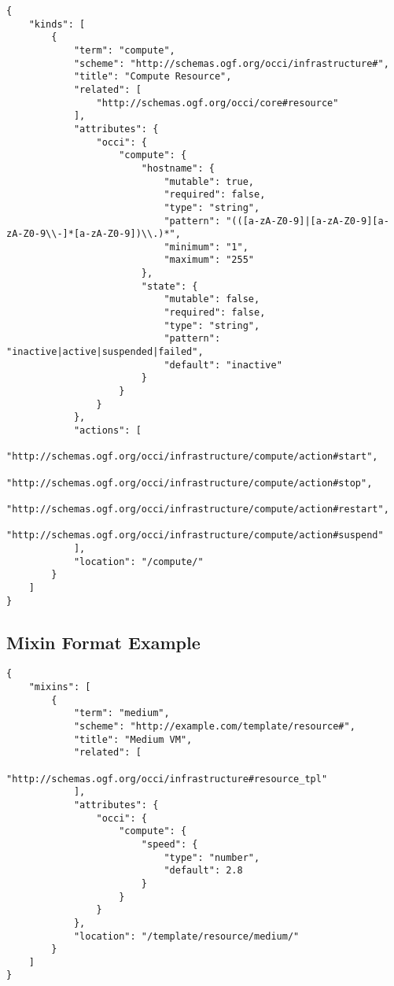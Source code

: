 \documentclass[10pt,a4paper]{article}
\begin{document}
\begin{verbatim}
{
    "kinds": [
        {
            "term": "compute",
            "scheme": "http://schemas.ogf.org/occi/infrastructure#",
            "title": "Compute Resource",
            "related": [
                "http://schemas.ogf.org/occi/core#resource"
            ],
            "attributes": {
                "occi": {
                    "compute": {
                        "hostname": {
                            "mutable": true,
                            "required": false,
                            "type": "string",
                            "pattern": "(([a-zA-Z0-9]|[a-zA-Z0-9][a-zA-Z0-9\\-]*[a-zA-Z0-9])\\.)*",
                            "minimum": "1",
                            "maximum": "255"
                        },
                        "state": {
                            "mutable": false,
                            "required": false,
                            "type": "string",
                            "pattern": "inactive|active|suspended|failed",
                            "default": "inactive"
                        }
                    }
                }
            },
            "actions": [
                "http://schemas.ogf.org/occi/infrastructure/compute/action#start",
                "http://schemas.ogf.org/occi/infrastructure/compute/action#stop",
                "http://schemas.ogf.org/occi/infrastructure/compute/action#restart",
                "http://schemas.ogf.org/occi/infrastructure/compute/action#suspend"
            ],
            "location": "/compute/"
        }
    ]
}
\end{verbatim}

\subsection{Mixin Format Example}
\label{sec:example_mixin}

\begin{verbatim}
{
    "mixins": [
        {
            "term": "medium",
            "scheme": "http://example.com/template/resource#",
            "title": "Medium VM",
            "related": [
                "http://schemas.ogf.org/occi/infrastructure#resource_tpl"
            ],
            "attributes": {
                "occi": {
                    "compute": {
                        "speed": {
                            "type": "number",
                            "default": 2.8
                        }
                    }
                }
            },
            "location": "/template/resource/medium/"
        }
    ]
}
\end{verbatim}
\end{document}

